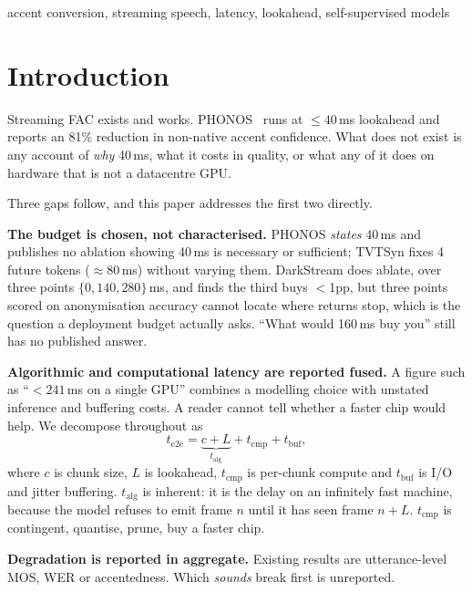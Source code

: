 \documentclass{article}
\newcommand{\talg}{\ensuremath{t_{\mathrm{alg}}}}
\newcommand{\tcmp}{\ensuremath{t_{\mathrm{cmp}}}}
\newcommand{\tbuf}{\ensuremath{t_{\mathrm{buf}}}}
\begin{document}
\begin{keywords}
accent conversion, streaming speech, latency, lookahead, self-supervised models
\end{keywords}

\section{Introduction}

Streaming FAC exists and works. PHONOS~\cite{phonos2026} runs at
${\leq}40$\,ms lookahead and reports an 81\% reduction in non-native accent
confidence. What does not exist is any account of \emph{why} 40\,ms, what it
costs in quality, or what any of it does on hardware that is not a datacentre
GPU.

Three gaps follow, and this paper addresses the first two directly.

\textbf{The budget is chosen, not characterised.} PHONOS \emph{states} 40\,ms
and publishes no ablation showing 40\,ms is necessary or sufficient; TVTSyn
fixes 4 future tokens ($\approx$80\,ms) without varying them. DarkStream does
ablate, over three points $\{0, 140, 280\}$\,ms, and finds the third buys
$<$1pp, but three points scored on anonymisation accuracy cannot locate
where returns stop, which is the question a deployment budget actually asks.
``What would 160\,ms buy you'' still has no published answer.

\textbf{Algorithmic and computational latency are reported fused.} A figure
such as ``${<}241$\,ms on a single GPU'' combines a modelling choice with
unstated inference and buffering costs. A reader cannot tell whether a faster
chip would help. We decompose throughout as
\begin{equation}
t_{\mathrm{e2e}} = \underbrace{c + L}_{t_{\mathrm{alg}}} + t_{\mathrm{cmp}} + t_{\mathrm{buf}},
\label{eq:decomp}
\end{equation}
where $c$ is chunk size, $L$ is lookahead, \tcmp{} is per-chunk compute and
\tbuf{} is I/O and jitter buffering. \talg{} is inherent: it is the delay on an
infinitely fast machine, because the model refuses to emit frame $n$ until it
has seen frame $n{+}L$. \tcmp{} is contingent, quantise, prune, buy a faster
chip.

\textbf{Degradation is reported in aggregate.} Existing results are
utterance-level MOS, WER or accentedness. Which \emph{sounds} break first is
unreported.
\end{document}
